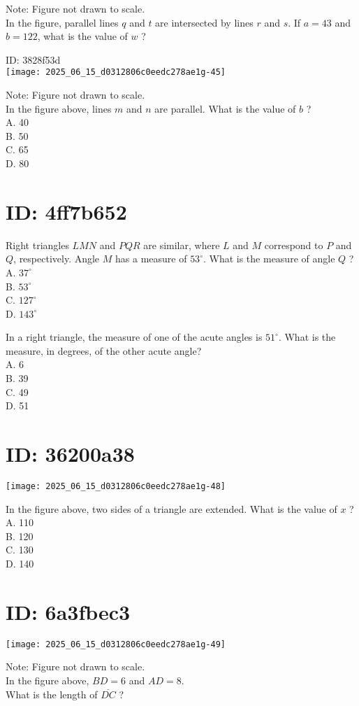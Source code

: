 Note: Figure not drawn to scale.\\
In the figure, parallel lines $q$ and $t$ are intersected by lines $r$ and $s$. If $a=43$ and $b=122$, what is the value of $w$ ?

ID: 3828f53d\\
\texttt{[image: 2025\_06\_15\_d0312806c0eedc278ae1g-45]}

Note: Figure not drawn to scale.\\
In the figure above, lines $m$ and $n$ are parallel. What is the value of $b$ ?\\
A. 40\\
B. 50\\
C. 65\\
D. 80

\section*{ID: 4ff7b652}
Right triangles $L M N$ and $P Q R$ are similar, where $L$ and $M$ correspond to $P$ and $Q$, respectively. Angle $M$ has a measure of $53^{\circ}$. What is the measure of angle $Q$ ?\\
A. $37^{\circ}$\\
B. $53^{\circ}$\\
C. $127^{\circ}$\\
D. $143^{\circ}$

In a right triangle, the measure of one of the acute angles is $51^{\circ}$. What is the measure, in degrees, of the other acute angle?\\
A. 6\\
B. 39\\
C. 49\\
D. 51

\section*{ID: 36200a38}
\begin{center}
\texttt{[image: 2025\_06\_15\_d0312806c0eedc278ae1g-48]}
\end{center}

In the figure above, two sides of a triangle are extended. What is the value of $x$ ?\\
A. 110\\
B. 120\\
C. 130\\
D. 140

\section*{ID: 6a3fbec3}
\begin{center}
\texttt{[image: 2025\_06\_15\_d0312806c0eedc278ae1g-49]}
\end{center}

Note: Figure not drawn to scale.\\
In the figure above, $B D=6$ and $A D=8$.\\
What is the length of $\overline{D C}$ ?


